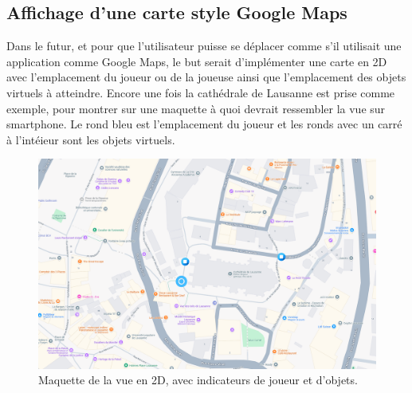 \subsection{Affichage d'une carte style Google Maps}
Dans le futur, et pour que l'utilisateur puisse se déplacer comme s'il utilisait une application comme
Google Maps, le but serait d'implémenter une carte en 2D avec l'emplacement du joueur ou de la joueuse ainsi que l'emplacement
des objets virtuels à atteindre. Encore une fois la cathédrale de Lausanne est prise comme exemple, pour montrer sur une maquette à quoi
devrait ressembler la vue sur smartphone. Le rond bleu est l'emplacement du joueur et les ronds avec un carré à l'intéieur sont les objets
virtuels.

\begin{figure}[H]
    \centering
    \includegraphics[width=1\linewidth]{assets/figures/Screenshots/Maps.png}
    \caption{Maquette de la vue en 2D, avec indicateurs de joueur et d'objets.}
    \label{fig:Maps}
\end{figure}


